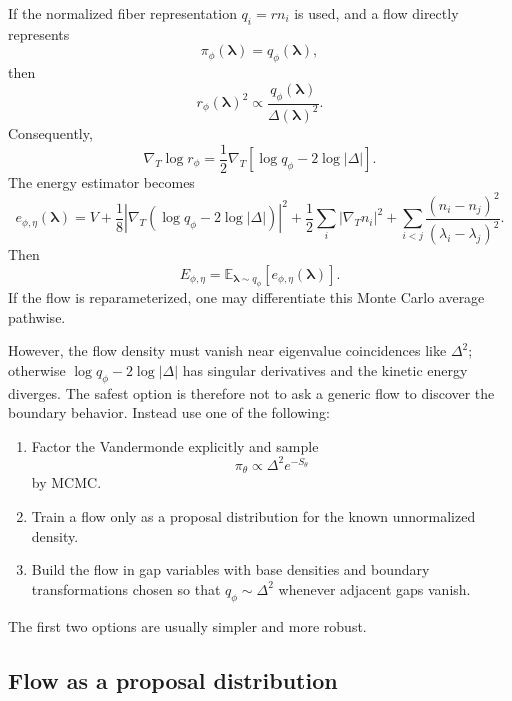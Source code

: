 \documentclass[11pt]{article}
\newcommand{\E}{\mathbb E}
\newcommand{\gradT}{\nabla_{\!T}}
\begin{document}
If the normalized fiber representation $q_i=r n_i$ is used, and a flow directly represents
\begin{equation}
\pi_\phi(\bm\lambda)=q_\phi(\bm\lambda),
\end{equation}
then
\begin{equation}
r_\phi(\bm\lambda)^2\propto\frac{q_\phi(\bm\lambda)}{\Delta(\bm\lambda)^2}.
\end{equation}
Consequently,
\begin{equation}
\gradT\log r_\phi
=\frac12\gradT\left[\log q_\phi-2\log|\Delta|\right].
\end{equation}
The energy estimator becomes
\begin{equation}
\boxed{
 e_{\phi,\eta}(\bm\lambda)
=V
+\frac18\left|\gradT\left(\log q_\phi-2\log|\Delta|\right)\right|^2
+\frac12\sum_i|\gradT n_i|^2
+\sum_{i<j}\frac{(n_i-n_j)^2}{(\lambda_i-\lambda_j)^2}.
}
\label{eq:flow_energy_estimator}
\end{equation}
Then
\begin{equation}
E_{\phi,\eta}=\E_{\bm\lambda\sim q_\phi}[e_{\phi,\eta}(\bm\lambda)].
\end{equation}
If the flow is reparameterized, one may differentiate this Monte Carlo average pathwise.

However, the flow density must vanish near eigenvalue coincidences like $\Delta^2$; otherwise $\log q_\phi-2\log|\Delta|$ has singular derivatives and the kinetic energy diverges.  The safest option is therefore not to ask a generic flow to discover the boundary behavior.  Instead use one of the following:
\begin{enumerate}[label=(\alph*)]
\item Factor the Vandermonde explicitly and sample
\begin{equation}
\pi_\theta\propto\Delta^2e^{-S_\theta}
\end{equation}
by MCMC.
\item Train a flow only as a proposal distribution for the known unnormalized density.
\item Build the flow in gap variables with base densities and boundary transformations chosen so that $q_\phi\sim\Delta^2$ whenever adjacent gaps vanish.
\end{enumerate}
The first two options are usually simpler and more robust.

\subsection{Flow as a proposal distribution}
\end{document}
